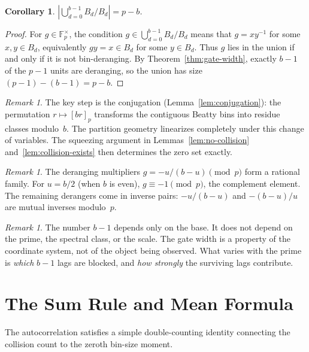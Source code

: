 \documentclass[12pt]{amsart}
\newtheorem{corollary}[theorem]{Corollary}
\theoremstyle{definition}
\theoremstyle{remark}
\newtheorem{remark}[theorem]{Remark}
\begin{document}
\begin{corollary}\label{cor:ratio-set}
$\displaystyle
\left|\bigcup_{d=0}^{b-1} B_d / B_d\right| = p - b$.
\end{corollary}

\begin{proof}
For $g \in \mathbb{F}_p^\times$, the condition
$g \in \bigcup_{d=0}^{b-1} B_d/B_d$ means that
$g = xy^{-1}$ for some $x,y \in B_d$, equivalently
$gy = x \in B_d$ for some $y \in B_d$. Thus
$g$ lies in the union if and only if it is not bin-deranging.
By Theorem~\ref{thm:gate-width}, exactly $b-1$ of the $p-1$
units are deranging, so the union has size
$(p-1)-(b-1)=p-b$.
\end{proof}

\begin{remark}
The key step is the conjugation
(Lemma~\ref{lem:conjugation}): the permutation $r \mapsto [br]_p$
transforms the contiguous Beatty bins into residue classes
modulo~$b$. The partition geometry linearizes completely under
this change of variables. The squeezing argument in
Lemmas~\ref{lem:no-collision} and~\ref{lem:collision-exists}
then determines the zero set exactly.
\end{remark}

\begin{remark}
The deranging multipliers $g = -u/(b{-}u) \pmod{p}$ form a
rational family. For $u = b/2$ (when $b$ is even),
$g \equiv -1 \pmod{p}$, the complement element. The remaining
derangers come in inverse pairs: $-u/(b{-}u)$ and $-(b{-}u)/u$
are mutual inverses modulo~$p$.
\end{remark}

\begin{remark}
The number $b - 1$ depends only on the base. It does not depend
on the prime, the spectral class, or the scale. The gate width
is a property of the coordinate system, not of the object being
observed. What varies with the prime is \emph{which} $b - 1$
lags are blocked, and \emph{how strongly} the surviving lags
contribute.
\end{remark}

\section{The Sum Rule and Mean Formula}

The autocorrelation satisfies a simple double-counting identity
connecting the collision count to the zeroth bin-size moment.
\end{document}
